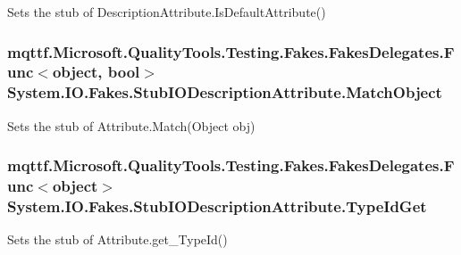 Sets the stub of Description\-Attribute.\-Is\-Default\-Attribute()

\hypertarget{class_system_1_1_i_o_1_1_fakes_1_1_stub_i_o_description_attribute_a98aad23d831045d5039bb66c3af33267}{
\subsubsection[{Match\-Object}]{\setlength{\rightskip}{0pt plus 5cm}mqttf.\-Microsoft.\-Quality\-Tools.\-Testing.\-Fakes.\-Fakes\-Delegates.\-Func$<$object, bool$>$ System.\-I\-O.\-Fakes.\-Stub\-I\-O\-Description\-Attribute.\-Match\-Object}}\label{class_system_1_1_i_o_1_1_fakes_1_1_stub_i_o_description_attribute_a98aad23d831045d5039bb66c3af33267}


Sets the stub of Attribute.\-Match(\-Object obj)

\hypertarget{class_system_1_1_i_o_1_1_fakes_1_1_stub_i_o_description_attribute_a982664be917f1423ff5107d8f278cfed}{
\subsubsection[{Type\-Id\-Get}]{\setlength{\rightskip}{0pt plus 5cm}mqttf.\-Microsoft.\-Quality\-Tools.\-Testing.\-Fakes.\-Fakes\-Delegates.\-Func$<$object$>$ System.\-I\-O.\-Fakes.\-Stub\-I\-O\-Description\-Attribute.\-Type\-Id\-Get}}\label{class_system_1_1_i_o_1_1_fakes_1_1_stub_i_o_description_attribute_a982664be917f1423ff5107d8f278cfed}


Sets the stub of Attribute.\-get\-\_\-\-Type\-Id()



